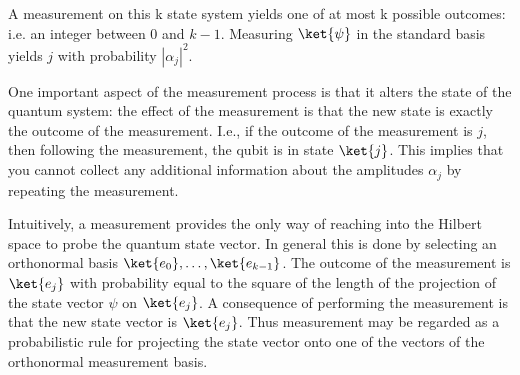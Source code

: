 \documentclass[12pt, oneside]{book}
\theoremstyle{definition}
\theoremstyle{definition}
\theoremstyle{remark}
\begin{document}
A measurement on this k state system yields one of at most k possible
outcomes: i.e. an integer between $0$ and $k-1$. Measuring $\ket{\psi}$ in the standard
basis yields $j$ with probability $|\alpha_j|^2$. 

One important aspect of the measurement process is that it alters the
state of the quantum system: the effect of the measurement is that the new
state is exactly the outcome of the measurement. I.e., if the outcome of the
measurement is $j$, then following the measurement, the qubit is in state $\ket{j}$.
This implies that you cannot collect any additional information about the
amplitudes $\alpha_j$ by repeating the measurement.

Intuitively, a measurement provides the only way of reaching into the
Hilbert space to probe the quantum state vector. In general this is done by
selecting an orthonormal basis $\ket{e_0},\ldots,\ket{e_{k-1}}$. The outcome of the measurement is $\ket{e_j}$ with probability equal to the square of the length of the projection
of the state vector $\psi$ on $\ket{e_j}$. A consequence of performing the measurement
is that the new state vector is $\ket{e_j}$. Thus measurement may be regarded as a
probabilistic rule for projecting the state vector onto one of the vectors of the
orthonormal measurement basis.
\end{document}
